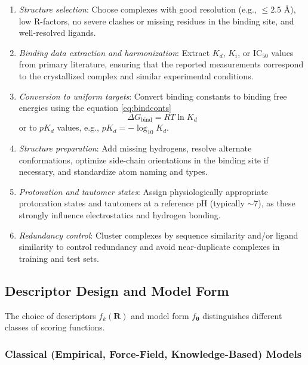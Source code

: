 \documentclass[12pt]{article}
\begin{document}
\begin{enumerate}
    \item \textit{Structure selection}: Choose complexes with good resolution (e.g., $\leq 2.5$ \r{A}), low R-factors, no severe clashes or missing residues in the binding site, and well-resolved ligands.
    \item \textit{Binding data extraction and harmonization}: Extract $K_d$, $K_i$, or IC$_{50}$ values from primary literature, ensuring that the reported measurements correspond to the crystallized complex and similar experimental conditions.
    \item \textit{Conversion to uniform targets}: Convert binding constants to binding free energies using the equation \ref{eq:bindconts}
    \begin{equation}
    \Delta G_{\text{bind}} = RT \ln K_d
    \label{eq:bindconts}
    \end{equation}
    or to $pK_d$ values, e.g., $pK_d = -\log_{10} K_d$.
    \item \textit{Structure preparation}: Add missing hydrogens, resolve alternate conformations, optimize side-chain orientations in the binding site if necessary, and standardize atom naming and types.
    \item \textit{Protonation and tautomer states}: Assign physiologically appropriate protonation states and tautomers at a reference pH (typically $\sim 7$), as these strongly influence electrostatics and hydrogen bonding.
    \item \textit{Redundancy control}: Cluster complexes by sequence similarity and/or ligand similarity to control redundancy and avoid near-duplicate complexes in training and test sets.
\end{enumerate}

\subsection{Descriptor Design and Model Form}

The choice of descriptors $f_k(\mathbf{R})$ and model form $f_{\boldsymbol{\theta}}$ distinguishes different classes of scoring functions.

\subsubsection{Classical (Empirical, Force-Field, Knowledge-Based) Models}
\end{document}
